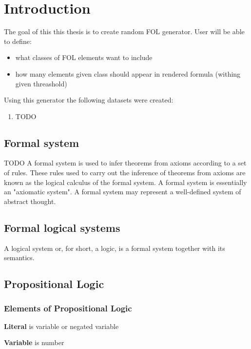 \chapter{Introduction}

The goal of this this thesis is to create random \gls{FOL} generator. User will be able to define:
\begin{itemize}
\item what classes of \gls{FOL} elements want to include
\item how many elements given class should appear in rendered formula (withing given threashold)
\end{itemize}

Using this generator the following datasets were created:
\begin{enumerate}
\item TODO
\end{enumerate}

\section{Formal system}
TODO
A formal system is used to infer theorems from axioms according to a set of rules. These rules used to carry out the inference of theorems from axioms are known as the logical calculus of the formal system. A formal system is essentially an "axiomatic system". A formal system may represent a well-defined system of abstract thought.

\section{Formal logical systems}

A logical system or, for short, a logic, is a formal system together with its semantics.

\section{Propositional Logic}
\subsection{Elements of Propositional Logic}

\textbf{Literal} is variable or negated variable

\textbf{Variable} is number

